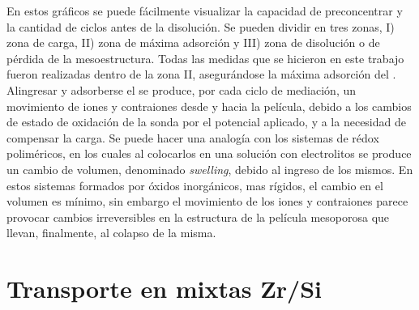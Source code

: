	    En estos gráficos se puede fácilmente visualizar la capacidad de preconcentrar y la cantidad de ciclos antes de la disolución. Se pueden dividir en tres zonas, I) zona de carga, II) zona de máxima adsorción y III) zona de disolución o de pérdida de la mesoestructura. Todas las medidas que se hicieron en este trabajo fueron realizadas dentro de la zona II, asegurándose la máxima adsorción del \ru\space. Al\space ingresar y adsorberse el \ru\space se produce, por cada ciclo de mediación, un movimiento de iones y contraiones desde y hacia la película, debido a los cambios de estado de oxidación de la sonda por el potencial aplicado, y a la necesidad de compensar la carga.  Se puede hacer una analogía con los sistemas de rédox poliméricos, en los cuales al colocarlos en una solución con electrolitos se produce un cambio de volumen, denominado \textit{swelling}, debido al ingreso de los mismos\cite{ybarra2005}. En estos sistemas formados por óxidos inorgánicos, mas rígidos, el cambio en el volumen es mínimo,\cite{Malfatti2009} sin embargo el movimiento de los iones y contraiones parece provocar cambios irreversibles en la estructura de la película mesoporosa que llevan, finalmente, al colapso de la misma.

	\section{Transporte en \pdm\space mixtas Zr/Si}


